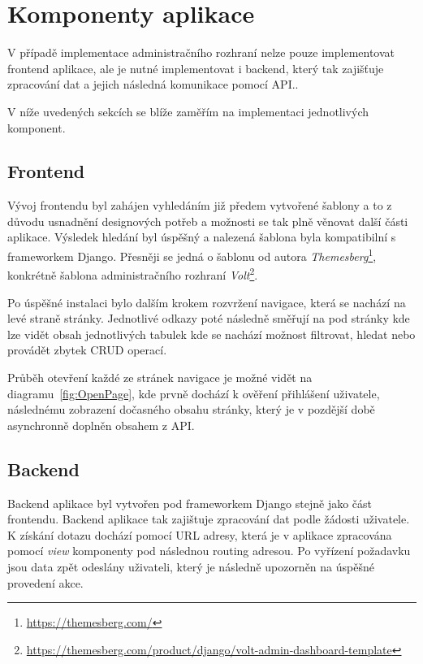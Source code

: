 \section{Komponenty aplikace}
\label{sec:implementation-components}
V případě implementace administračního rozhraní nelze pouze implementovat frontend aplikace, ale je nutné implementovat i backend, který tak zajišťuje zpracování dat a jejich následná komunikace pomocí API.\@.

V níže uvedených sekcích se blíže zaměřím na implementaci jednotlivých komponent.

\subsection{Frontend}
\label{subsec:implementation-frontend}
Vývoj frontendu byl zahájen vyhledáním již předem vytvořené šablony a to z důvodu usnadnění designových potřeb a možnosti se tak plně věnovat další části aplikace. Výsledek hledání byl úspěšný a nalezená šablona byla kompatibilní s frameworkem Django. Přesněji se jedná o šablonu od autora \textit{Themesberg}\footnote{\href{https://themesberg.com/}{https://themesberg.com/}}, konkrétně šablona administračního rozhraní \textit{Volt}\footnote{\href{https://themesberg.com/product/django/volt-admin-dashboard-template}{https://themesberg.com/product/django/volt-admin-dashboard-template}}.

Po úspěšné instalaci bylo dalším krokem rozvržení navigace, která se nachází na levé straně stránky. Jednotlivé odkazy poté následně směřují na pod stránky kde lze vidět obsah jednotlivých tabulek kde se nachází možnost filtrovat, hledat nebo provádět zbytek CRUD operací.

Průběh otevření každé ze stránek navigace je možné vidět na diagramu~\ref{fig:OpenPage}, kde prvně dochází k ověření přihlášení uživatele, následnému zobrazení dočasného obsahu stránky, který je v pozdější době asynchronně doplněn obsahem z API\@.


\subsection{Backend}
\label{subsec:implementation-backend}
Backend aplikace byl vytvořen pod frameworkem Django stejně jako část frontendu. Backend aplikace tak zajištuje zpracování dat podle žádosti uživatele. K získání dotazu dochází pomocí URL adresy, která je v aplikace zpracována pomocí \textit{view} komponenty pod následnou routing adresou. Po vyřízení požadavku jsou data zpět odeslány uživateli, který je následně upozorněn na úspěšné provedení akce.

